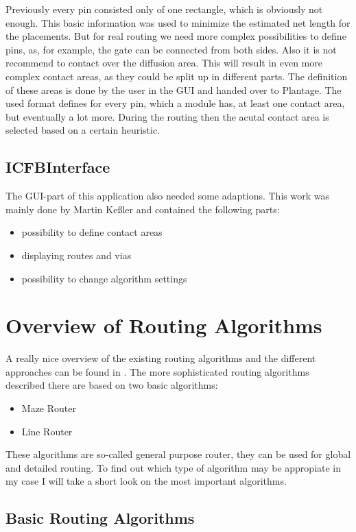 Previously every pin consisted only of one rectangle, which is obviously not enough. This basic information was used to minimize the estimated net length for the placements. But for real routing we need more complex possibilities to define pins, as, for example, the gate can be connected from both sides. Also it is not recommend to contact over the diffusion area. This will result in even more complex contact areas, as they could be split up in different parts. The definition of these areas is done by the user in the GUI and handed over to Plantage. The used format defines for every pin, which a module has, at least one contact area, but eventually a lot more. During the routing then the acutal contact area is selected based on a certain heuristic.

\subsection{ICFBInterface}
The GUI-part of this application also needed some adaptions. This work was mainly done by Martin Keßler and contained the following parts:

\begin{itemize}
\item possibility to define contact areas
\item displaying routes and vias
\item possibility to change algorithm settings
\end{itemize}	

\section{Overview of Routing Algorithms}
A really nice overview of the existing routing algorithms and the different approaches can be found in \cite[page 149 till 201]{springer:eda_analog_routing}. The more sophisticated routing algorithms described there are based on two basic algorithms:
\begin{itemize}
\item Maze Router
\item Line Router
\end{itemize}
These algorithms are so-called general purpose router, they can be used for global and detailed routing. To find out which type of algorithm may be appropiate in my case I will take a short look on the most important algorithms.

\subsection{Basic Routing Algorithms}
